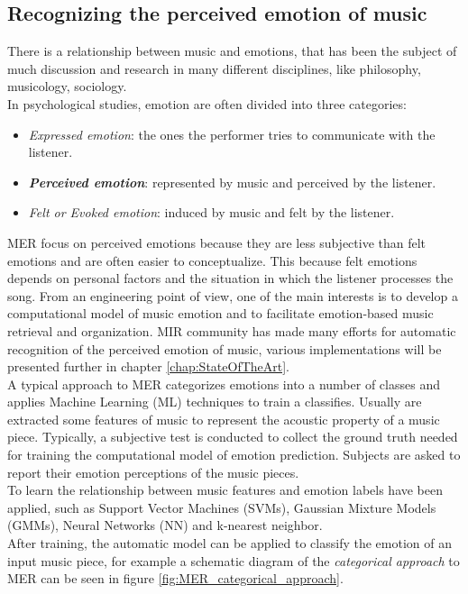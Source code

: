\subsection{Recognizing the perceived emotion of music}
There is a relationship between music and emotions, that has been the subject of much discussion and research in many different disciplines, like philosophy, musicology, sociology.
\\
In psychological studies, emotion are often divided into three categories:
\begin{itemize}
	\item \textit{Expressed emotion}: the ones the performer tries to communicate with the listener.
	\item \textit{\textbf{Perceived emotion}}: represented by music and perceived by the listener.
	\item \textit{Felt or Evoked emotion}: induced by music and felt by the listener.
\end{itemize}

MER focus on perceived emotions because they are less subjective than felt emotions and are often easier to conceptualize. This because felt emotions depends on personal factors and the situation in which the listener processes the song.
From an engineering point of view, one of the main interests is to develop a computational model of music emotion and to facilitate emotion-based music retrieval and organization. MIR community has made many efforts for automatic recognition of the perceived emotion of music, various implementations will be presented further in chapter \ref{chap:StateOfTheArt}.
\\
A typical approach to MER categorizes emotions into a number of classes and applies Machine Learning (ML) techniques to train a classifies. Usually are extracted some features of music to represent the acoustic property of a music piece. Typically, a subjective test is conducted to collect the ground truth needed for training the computational model of emotion prediction. Subjects are asked to report their emotion perceptions of the music pieces.
\\
To learn the relationship between music features and emotion labels have been applied, such as Support Vector Machines (SVMs), Gaussian Mixture Models (GMMs), Neural Networks (NN) and k-nearest neighbor.
\\
After training, the automatic model can be applied to classify the emotion of an input music piece, for example a schematic diagram of the \textit{categorical approach} to MER can be seen in figure \ref{fig:MER_categorical_approach}.

